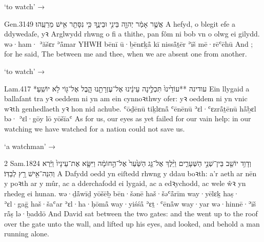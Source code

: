\begin{frame}{\ex {} ‘to watch’ → }
	\begin{example}{Gen.}{31}{49}{}{}
		\quoling
		{ אֲשֶׁ֣ר אָמַ֔ר  יְהוָ֖ה בֵּינִ֣י וּבֵינֶ֑ךָ כִּ֥י נִסָּתֵ֖ר אִ֥ישׁ מֵרֵעֵֽהוּ׃}
		{A  hefyd, o blegit efe a ddywedaſe,  yꝛ Arglwydd rhwng o fi a thithe, pan fôm ni bob vn o olwg ei gilydd.}
		{wə·ham· ʾăšɛr ʾå̄mar  YHWH bēnī ū·ḇēnɛḵå̄ kī nisså̄ṯēr ʾīš mē·rēʿēhū}
		{And ; for he said, The {\LORD}  between me and thee, when we are absent one from another.}
	\end{example}
\end{frame}


\begin{frame}{\ex {} ‘to watch’ → }
	\begin{example}{Lam.}{4}{17}{}{}
		\quoling
		{*עודינה **עוֹדֵ֙ינוּ֙ תִּכְלֶ֣ינָה עֵינֵ֔ינוּ אֶל־עֶזְרָתֵ֖נוּ הָ֑בֶל   אֶל־גּ֖וֹי לֹ֥א יוֹשִֽׁעַ׃}
		{Ein llygaid a ballaſant tra yꝛ oeddem ni yn  am ein cynnoꝛthwy ofer:  yꝛ oeddem ni yn vnic wꝛth genhedlaeth yꝛ hon nid achube.}
		{ʿōḏēnū tiḵlɛnå̄ ʿēnēnū ʾɛl·ʿɛzrå̄ṯēnū hå̄ḇɛl bə·  ʾɛl·gōy lō yōšīaʿ}
		{As for us, our eyes as yet failed for our vain help: in our watching we have watched for a nation  could not save us.}
	\end{example}
\end{frame}


\begin{frame}{\ex {} ‘a watchman’ → }
	\begin{example}{2 Sam.}{18}{24}{}{}
		\quoling
		{וְדָוִ֥ד יוֹשֵׁ֖ב בֵּין־שְׁנֵ֣י הַשְּׁעָרִ֑ים וַיֵּ֨לֶךְ  אֶל־גַּ֤ג הַשַּׁ֙עַר֙ אֶל־הַ֣חוֹמָ֔ה וַיִּשָּׂ֤א אֶת־עֵינָיו֙ וַיַּ֔רְא וְהִנֵּה־אִ֖ישׁ רָ֥ץ לְבַדּֽוֹ׃}
		{A Dafydd oedd yn eiſtedd rhwng y ddau boꝛth: a’r  aeth ar nēn y poꝛth ar y mûr, ac a dderchafodd ei lygaid, ac a edꝛychodd, ac wele ŵꝛ yn rhedeg ei hunan.}
		{wə·ḏå̄wīḏ yōšēḇ bēn·šənē haš·šəʿå̄rīm way·yēlɛḵ haṣ· ʾɛl·gaḡ haš·šaʿar ʾɛl·ha·ḥōmå̄ way·yiśśå̄ ʾɛṯ·ʿēnå̄w way·yar wə·hinnē·ʾīš rå̄ṣ lə·ḇaddō}
		{And David sat between the two gates: and the  went up to the roof over the gate unto the wall, and lifted up his eyes, and looked, and behold a man running alone.}
	\end{example}
\end{frame}



